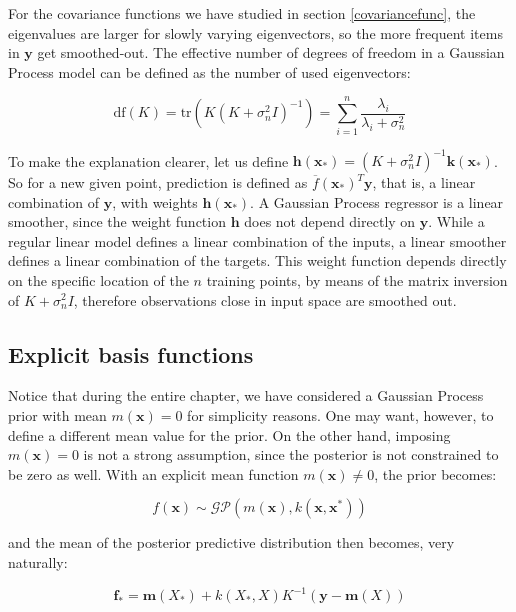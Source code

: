 \documentclass[10pt,a4paper,twoside]{book}
\begin{document}
For the covariance functions we have studied in section \ref{covariancefunc}, the eigenvalues are larger for slowly varying eigenvectors, so the more frequent items in $\boldsymbol{y}$ get smoothed-out. The effective number of degrees of freedom in a Gaussian Process model can be defined as the number of used eigenvectors:

\begin{equation}
\mathrm{df}(K) = \mathrm{tr}(K(K + \sigma_n^2 I)^{-1}) = \sum_{i=1}^n\dfrac{\lambda_i}{\lambda_i + \sigma_n^2}
\end{equation}

To make the explanation clearer, let us define $\boldsymbol{h}(\boldsymbol{x}_*) = (K + \sigma_n^2 I)^{-1}\boldsymbol{k}(\boldsymbol{x}_*)$. So for a new given point, prediction is defined as $\overline{f}(\boldsymbol{x}_*)^T \boldsymbol{y}$, that is, a linear combination of $\boldsymbol{y}$, with weights $\boldsymbol{h}(\boldsymbol{x}_*)$. A Gaussian Process regressor is a linear smoother, since the weight function $\boldsymbol{h}$ does not depend directly on $\boldsymbol{y}$. While a regular linear model defines a linear combination of the inputs, a linear smoother defines a linear combination of the targets. This weight function depends directly on the specific location of the $n$ training points, by means of the matrix inversion of $K + \sigma_n^2 I$, therefore observations close in input space are smoothed out.

\subsection{Explicit basis functions}

Notice that during the entire chapter, we have considered a Gaussian Process prior with mean $m(\boldsymbol{x}) = 0$ for simplicity reasons. One may want, however, to define a different mean value for the prior. On the other hand, imposing $m(\boldsymbol{x}) = 0$ is not a strong assumption, since the posterior is not constrained to be zero as well. With an explicit mean function $m(\boldsymbol{x}) \neq 0$, the prior becomes:

\begin{equation}
f(\boldsymbol{x}) \sim \mathcal{G}\mathcal{P}\left(m(\boldsymbol{x}), k(\boldsymbol{x}, \boldsymbol{x^*})\right)
\end{equation}

and the mean of the posterior predictive distribution then becomes, very naturally:

\begin{equation}
\boldsymbol{f}_* = \boldsymbol{m}(X_*) + k(X_*, X)K^{-1}\left(\boldsymbol{y} - \boldsymbol{m}(X)\right) 
\end{equation}
\end{document}
